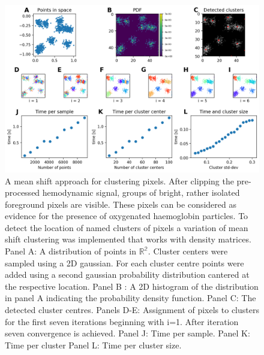 \begin{figure}[!htb]
\centering
\includegraphics[width=\textwidth,height=\textheight,keepaspectratio]{Figures/clustering_approach_properties}
\decoRule
\caption[A mean shift approach for clustering pixels]{A mean shift approach for clustering pixels. After clipping the pre-processed hemodynamic signal, groups of bright, rather isolated foreground pixels are visible. These pixels can be considered as evidence for the presence of oxygenated haemoglobin particles. To detect the location of named clusters of pixels a variation of mean shift clustering was implemented that works with density matrices. Panel A: A distribution of points in $\mathbb{R^2}$. Cluster centers were sampled using a 2D gaussian. For each cluster centre points were added using a second gaussian probability distribution cantered at the respective location. Panel B : A 2D histogram of the distribution in panel A indicating the probability density function. Panel C: The detected cluster centres. Panels D-E: Assignment of pixels to clusters for the first seven iterations beginning with i=1. After iteration seven convergence is achieved. Panel J: Time per sample. Panel K: Time per cluster Panel L: Time per cluster size. }
\label{fig:clustering_approach_properties}
\end{figure}

